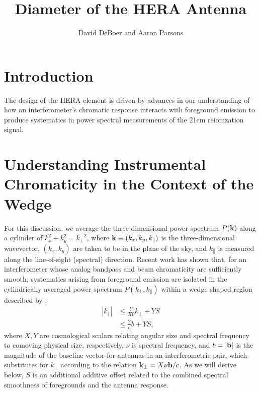 \documentclass[11pt]{article}
\newcommand{\kvec}{{\bf k}}
\newcommand{\bvec}{{\bf b}}
\newcommand{\kpr}{{k_\perp}}
\newcommand{\kvpr}{{\kvec_\perp}}
\newcommand{\kpl}{{k_\parallel}}
\begin{document}
\title{Diameter of the HERA Antenna}
\author{David DeBoer and Aaron Parsons}
\maketitle

\section{Introduction}

The design of the HERA element is driven by advances in our understanding of how
an interferometer's chromatic response interacts with foreground emission to
produce systematics in power spectral measurements of the 21cm reionization signal.

\section{Understanding Instrumental Chromaticity in the Context of the Wedge}

For this discussion, we average the three-dimensional power spectrum $P(\kvec)$ along a cylinder
of $k_x^2+k_y^2=\kpr^2$, where $\kvec\equiv(k_x,k_y,\kpl)$ is the three-dimensional wavevector,
$(k_x,k_y)$ are taken to be in the plane of the sky, and $\kpl$ is measured along the line-of-sight (spectral)
direction.
Recent work has shown that, for an interferometer whose
analog bandpass and beam chromaticity are sufficiently smooth, systematics arising from foreground emission
are isolated in the cylindrically averaged power spectrum $P(\kpr,\kpl)$ within
a wedge-shaped region described by \citep{parsons_et_al2012b,pober_et_al2013,parsons_et_al2014,ali_et_al2015}:
\begin{align}
|\kpl| &\le \frac{Y}{X\nu}\kpr + YS\nonumber\\
&\le \frac{Y}{c}b + YS,
\label{eq:wedge_bound}
\end{align}
where $X,Y$ are cosmological scalars relating angular size and spectral frequency to comoving 
physical size, respectively, $\nu$ is spectral frequency, and $b=|\bvec|$ is the magnitude of the baseline vector for
antennas in an interferometric pair, which substitutes for $\kpr$ according to the
relation $\kvpr=X\nu\bvec/c$. As we will derive below, $S$ is an additional additive offset related to
the combined spectral smoothness of foregrounds and the antenna response.
\end{document}
